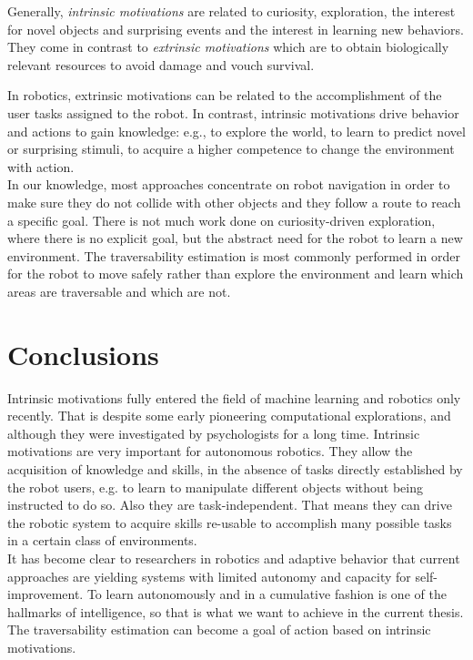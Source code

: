 \documentclass[12pt,a4paper,table,dvipsnames,tikz]{report}
\newcommand{\term}{\textit}
\begin{document}
	Generally, \term{intrinsic motivations} are related to curiosity, exploration, 
	the interest for novel objects and surprising events and the interest in 
	learning new behaviors. They come in contrast to \term{extrinsic motivations} 
	which are to obtain biologically relevant resources to avoid damage and vouch 
	survival.
	\par
	In robotics, extrinsic motivations can be related to the accomplishment of the 
	user tasks assigned to the robot. In contrast, intrinsic motivations drive 
	behavior and actions to gain knowledge: e.g., to explore the world, to learn to 
	predict novel or surprising stimuli, to acquire a higher competence to change 
	the environment with action.
	\\
	
	In our knowledge, most approaches concentrate on robot navigation in order to 
	make sure they do not collide with other objects and they follow a route to 
	reach a specific goal. There is not much work done on curiosity-driven 
	exploration, where there is no explicit goal, but the abstract need for the 
	robot to learn a new environment. The traversability estimation is most commonly 
	performed in order for the robot to move safely rather than explore the 
	environment and learn which areas are traversable and which are not.
	\\
		
	\section{Conclusions}
	\label{sec:bg:concl}
	
	Intrinsic motivations fully entered the field of machine learning and robotics 
	only recently. That is despite some early pioneering computational explorations, 
	and although they were investigated by psychologists for a long time. Intrinsic 
	motivations are very important for autonomous robotics. They allow the acquisition 
	of knowledge and skills, in the absence of tasks directly established by the robot 
	users, e.g. to learn to manipulate different objects without being instructed to 
	do so. Also they are task-independent. That means they can drive the robotic system 
	to acquire skills re-usable to accomplish many possible tasks in a certain class 
	of environments.
	\\
	
	It has become clear to researchers in robotics and adaptive behavior that 
	current approaches are yielding systems with limited autonomy and capacity for 
	self-improvement. To learn autonomously and in a cumulative fashion is one of 
	the hallmarks of intelligence, so that is what we want to achieve in the current 
	thesis. The traversability estimation can become a goal of action based on 
	intrinsic motivations.
	\\
	
\end{document}
